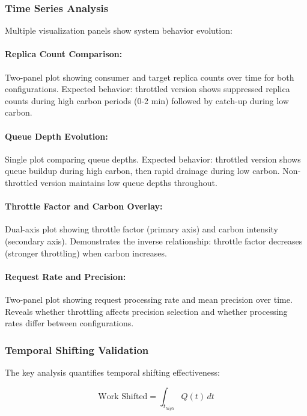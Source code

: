 \subsubsection{Time Series Analysis}

Multiple visualization panels show system behavior evolution:

\paragraph{Replica Count Comparison:} Two-panel plot showing consumer and target replica counts over time for both configurations. Expected behavior: throttled version shows suppressed replica counts during high carbon periods (0-2 min) followed by catch-up during low carbon.

\paragraph{Queue Depth Evolution:} Single plot comparing queue depths. Expected behavior: throttled version shows queue buildup during high carbon, then rapid drainage during low carbon. Non-throttled version maintains low queue depths throughout.

\paragraph{Throttle Factor and Carbon Overlay:} Dual-axis plot showing throttle factor (primary axis) and carbon intensity (secondary axis). Demonstrates the inverse relationship: throttle factor decreases (stronger throttling) when carbon increases.

\paragraph{Request Rate and Precision:} Two-panel plot showing request processing rate and mean precision over time. Reveals whether throttling affects precision selection and whether processing rates differ between configurations.

\subsubsection{Temporal Shifting Validation}

The key analysis quantifies temporal shifting effectiveness:

\begin{equation}
    \text{Work Shifted} = \int_{t_{high}} Q(t) \, dt
\end{equation}

